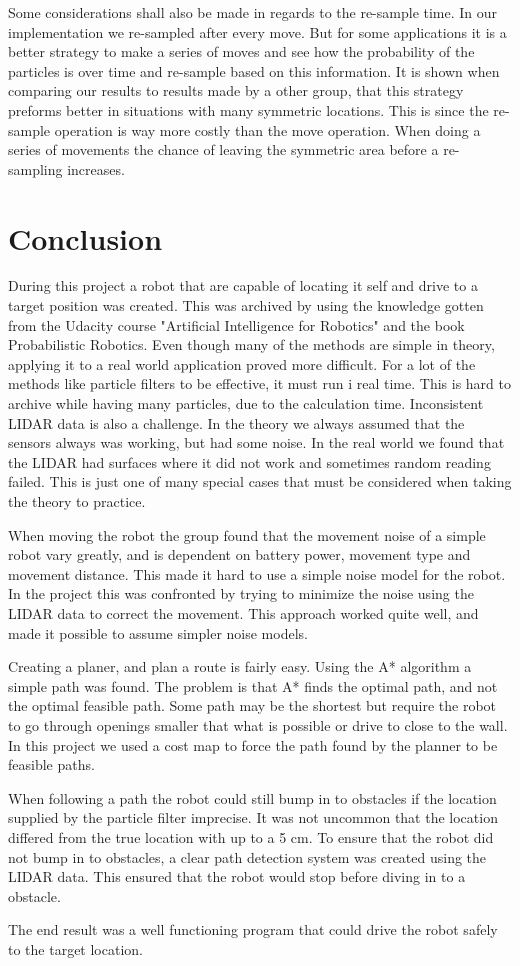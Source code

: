 Some considerations shall also be made in regards to the re-sample time. In our implementation we re-sampled after every move. But for some applications it is a better strategy to make a series of moves and see how the probability of the particles is over time and re-sample based on this information. It is shown when comparing our results to results made by a other group, that this strategy preforms better in situations with many symmetric locations. This is since the re-sample operation is way more costly than the move operation. When doing a series of movements the chance of leaving the symmetric area before a re-sampling increases.


\chapter{Conclusion}
During this project a robot that are capable of locating it self and drive to a target position was created. This was archived by using the knowledge gotten from the Udacity course "Artificial Intelligence for Robotics"\cite{AIROK} and the book Probabilistic Robotics\cite{thrun2005probabilistic}. Even though many of the methods are simple in theory, applying it to a real world application proved more difficult. For a lot of the methods like particle filters to be effective, it must run i real time. This is hard to archive while having many particles, due to the calculation time. Inconsistent LIDAR data is also a challenge. In the theory we always assumed that the sensors always was working, but had some noise. In the real world we found that the LIDAR had surfaces where it did not work and sometimes random reading failed. This is just one of many special cases that must be considered when taking the theory to practice.  

When moving the robot the group found that the movement noise of a simple robot vary greatly, and is dependent on battery power, movement type and movement distance. This made it hard to use a simple noise model for the robot. In the project this was confronted by trying to minimize the noise using the LIDAR data to correct the movement. This approach worked quite well, and made it possible to assume simpler noise models.

Creating a planer, and plan a route is fairly easy. Using the A* algorithm a simple path was found. The problem is that A* finds the optimal path, and not the optimal feasible path. Some path may be the shortest but require the robot to go through openings smaller that what is possible or drive to close to the wall. In this project we used a cost map to force the path found by the planner to be feasible paths.

When following a path the robot could still bump in to obstacles if the location supplied by the particle filter imprecise. It was not uncommon that the location differed from the true location with up to a 5 cm. To ensure that the robot did not bump in to obstacles, a clear path detection system was created using the LIDAR data. This ensured that the robot would stop before diving in to a obstacle. 

The end result was a well functioning program that could drive the robot safely to the target location. 